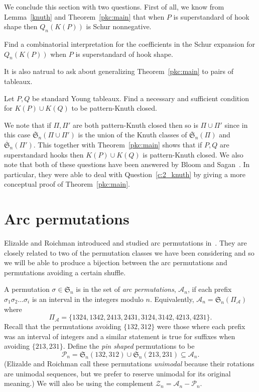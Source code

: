 \documentclass[ALCO,ThmDefs,Unicode,epreuves]{cedram}
\newcommand{\ofS}{\ol{\fS}}
\newcommand{\ol}{\overline}
\newcommand{\sbe}{\subseteq}
\newcommand{\si}{\sigma}
\newcommand{\cA}{{\mathcal A}}
\newcommand{\cP}{{\mathcal P}}
\newcommand{\cZ}{{\mathcal Z}}
\newcommand{\fS}{{\mathfrak S}}
\begin{document}
We conclude this section with two questions. 
First of all, we know from Lemma~\ref{knuth} and Theorem~\ref{pkc:main} that when $P$ is superstandard of hook shape then %
$Q_n(K(P))$ is Schur nonnegative.
\begin{question}
Find a combinatorial interpretation for the coefficients in the Schur expansion for $Q_n(K(P))$ when $P$ is superstandard of hook shape.
\end{question}
It is also natrual to ask about generalizing Theorem~\ref{pkc:main} to pairs of tableaux.
\begin{question}
\label{c:2_knuth}
Let $P,Q$ be standard Young tableaux. Find a necessary and sufficient condition for $K(P) \cup K(Q)$ to be pattern-Knuth closed.
 \end{question}

We note that if $\Pi,\Pi'$ are both pattern-Knuth closed then so is $\Pi\cup\Pi'$ since in this case $\ofS_n(\Pi\cup\Pi')$ is the union of the Knuth classes of $\ofS_n(\Pi)$ and $\ofS_n(\Pi')$. This together with Theorem~\ref{pkc:main} shows that if $P,Q$ are superstandard hooks then $K(P) \cup K(Q)$ is %
pattern-Knuth closed.  We also note that both of these questions have been answered by Bloom and Sagan~\cite{ajout}.  In particular, they were able to deal with Question~\ref{c:2_knuth} by giving a more conceptual proof of Theorem~\ref{pkc:main}.


\section{Arc permutations}
\label{ap}

Elizalde and Roichman introduced and studied arc permutations in~\cite{er:ap,er:sap}. They are closely related to two of the permutation classes we have been considering and so we will be able to produce a bijection between the arc permutations and permutations avoiding a certain shuffle.

A permutation $\si\in\fS_n$ is in the set of \emph{arc permutations}, $\cA_n$, if each prefix $\si_1\si_2\dots\si_i$ is an interval in the integers modulo $n$. Equivalently, $\cA_n=\fS_n(\Pi_\cA)$ where
\[
\Pi_\cA=\{1324,1342,2413,2431,3124,3142,4213,4231\}.
\]
Recall that the permutations avoiding $\{132,312\}$ were those where each prefix was an interval of integers and a similar statement is true for suffixes when avoiding $\{213,231\}$. Define the \emph{pin shaped} permutations to be
\[
\cP_n=\fS_n(132,312)\cup\fS_n(213,231)\sbe \cA_n.
\]
(Elizalde and Roichman call these permutations \emph{unimodal} because their rotations are unimodal sequences, but we prefer to reserve unimodal for its original meaning.) We will also be using the complement $\cZ_n=\cA_n-\cP_n$.
\end{document}
